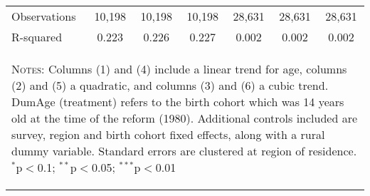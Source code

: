 \begin{landscape}
\begin{table}[htpb!]
\begin{center}
\begin{tabular}{lcccccc}
Observations&10,198&10,198&10,198&28,631&28,631&28,631\\
R-squared&0.223&0.226&0.227&0.002&0.002&0.002\\
\midrule
\multicolumn{7}{p{15.4cm}}{\begin{footnotesize}\textsc{Notes:} Columns (1) and (4) include a linear trend for age, columns (2) and (5) a quadratic, and columns (3) and (6) a cubic trend.  DumAge (treatment) refers to the birth cohort which was 14 years old at the time of the reform (1980).  Additional controls included are survey, region and birth cohort fixed effects, along with a rural dummy variable. Standard errors are clustered at region of residence.
$^{*}$p$<$0.1; $^{**}$p$<$0.05; $^{***}$p$<$0.01\end{footnotesize}} \\ \bottomrule 
\end{tabular}\end{center}\end{table}\end{landscape}